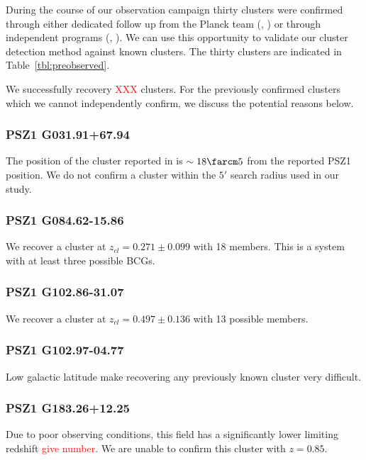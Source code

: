 \documentclass[apj, revtex4]{emulateapj}
\newcommand{\editorial}[1]{\textcolor{red}{#1}}
\begin{document}
During the course of our observation campaign thirty clusters were confirmed through either dedicated follow up from the Planck team (\eg, \citealt{PlanckCollaboration2015, PlanckCollaboration2016a}) or through independent programs (\eg, \citealt{Liu2015a, VanderBurg2016, Burenin2017, Burenin2018, Amodeo2018, Barrena2018, Streblyanska2018}). We can use this opportunity to validate our cluster detection method against known clusters. The thirty clusters are indicated in Table~\ref{tbl:preobserved}.

We successfully recovery \editorial{XXX} clusters. For the previously confirmed clusters which we cannot independently confirm, we discuss the potential reasons below.

\subsubsection{PSZ1 G031.91+67.94}

The position of the cluster reported in \cite{PlanckCollaboration2016a} is $\sim18\farcm5$ from the reported PSZ1 position. We do not confirm a cluster within the $5'$ search radius used in our study.

\subsubsection{PSZ1 G084.62-15.86}
We recover a cluster at $z_{cl} = 0.271 \pm 0.099$ with 18 members. This is a system with at least three possible BCGs.

\subsubsection{PSZ1 G102.86-31.07}
We recover a cluster at $z_{cl} = 0.497 \pm 0.136$ with 13 possible members.

\subsubsection{PSZ1 G102.97-04.77}
Low galactic latitude make recovering any previously known cluster very difficult.

\subsubsection{PSZ1 G183.26+12.25}

Due to poor observing conditions, this field has a significantly lower limiting redshift \editorial{give number}. We are unable to confirm this cluster with $z=0.85.$ 
\end{document}
